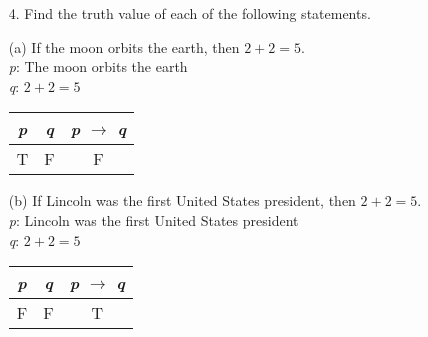 \documentclass{article}
\begin{document}
\begin{itemize}
    (c) If two lines are parallel, then alternate interior angles are equal.\\
    Converse: {\color{blue} If the alternate interior angles are equal, then the two lines are parallel.}\\
    Inverse: {\color{olive} If two lines are not parallel, then the alternate interior angles are not equal.}\\
    Contrapositive: {\color{purple} If the alternate interior angles are not equal, then the two lines are not parallel.}
    
    (d) If Joyce is smiling, then she is happy.\\
    Converse: {\color{blue} If she is happy, then Joyce is smiling.}\\
    Inverse: {\color{olive} If Joyce isn't smiling, then she isn't happy}\\
    Contrapositive: {\color{purple} If she isn't happy, then Joyce isn't smiling.}
    
    \item[4.] Find the truth value of each of the following statements.
    
    (a) If the moon orbits the earth, then $2 + 2 = 5$.\\
    \hspace*{1cm}\emph{p}: The moon orbits the earth\\
    \hspace*{1cm}\emph{q}: $2 + 2 = 5$\\
        \hspace*{1cm}\begin{tabular}{|c|c|c|}
            \hline
            \emph{p} & \emph{q} & \emph{p} $\to$ \emph{q} \\
            \hline
            T & F & F\\
            \hline
        \end{tabular}
    
    
    (b) If Lincoln was the first United States president, then $2 + 2 = 5$.\\
    \hspace*{1cm}\emph{p}: Lincoln was the first United States president\\
    \hspace*{1cm}\emph{q}: $2 + 2 = 5$\\
        \hspace*{1cm}\begin{tabular}{|c|c|c|}
            \hline
            \emph{p} & \emph{q} & \emph{p} $\to$ \emph{q} \\
            \hline
            F & F & T\\
            \hline
        \end{tabular}
    

\end{itemize}
\end{document}
